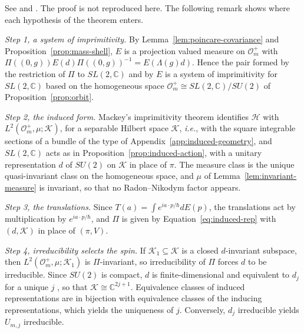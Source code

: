 	\noindent See \cite[TODO-location]{TODO-Wigner1939} and \cite[TODO-location]{TODO-Mackey1958}. The proof is not reproduced here. The following remark shows where each hypothesis of the theorem enters.
	
	\begin{remark}\label{rem:mackey-steps}
		\emph{Step 1, a system of imprimitivity.} By Lemma~\ref{lem:poincare-covariance} and Proposition~\ref{prop:mass-shell}, $E$ is a projection valued measure on $\mathcal{O}_m^+$ with $\Pi((0,g))E(d)\Pi((0,g))^{-1}=E(\Lambda(g)d)$. Hence the pair formed by the restriction of $\Pi$ to $SL(2,\mathbb{C})$ and by $E$ is a system of imprimitivity for $SL(2,\mathbb{C})$ based on the homogeneous space $\mathcal{O}_m^+\cong SL(2,\mathbb{C})/SU(2)$ of Proposition~\ref{prop:orbit}.
		
		\emph{Step 2, the induced form.} Mackey's imprimitivity theorem identifies $\mathcal{H}$ with $L^2(\mathcal{O}_m^+,\mu;\mathcal{K})$, for a separable Hilbert space $\mathcal{K}$, \textit{i.e.}, with the square integrable sections of a bundle of the type of Appendix~\ref{app:induced-geometry}, and $SL(2,\mathbb{C})$ acts as in Proposition~\ref{prop:induced-action}, with a unitary representation $d$ of $SU(2)$ on $\mathcal{K}$ in place of $\pi$. The measure class is the unique quasi-invariant class on the homogeneous space, and $\mu$ of Lemma~\ref{lem:invariant-measure} is invariant, so that no Radon--Nikodym factor appears.
		
		\emph{Step 3, the translations.} Since $T(a)=\int e^{ia\cdot p/\hbar}dE(p)$, the translations act by multiplication by $e^{ia\cdot p/\hbar}$, and $\Pi$ is given by Equation~\eqref{eq:induced-rep} with $(d,\mathcal{K})$ in place of $(\pi,V)$.
		
		\emph{Step 4, irreducibility selects the spin.} If $\mathcal{K}_1\subseteq\mathcal{K}$ is a closed $d$-invariant subspace, then $L^2(\mathcal{O}_m^+,\mu;\mathcal{K}_1)$ is $\Pi$-invariant, so irreducibility of $\Pi$ forces $d$ to be irreducible. Since $SU(2)$ is compact, $d$ is finite-dimensional and equivalent to $d_j$ for a unique $j$ \cite[TODO-location]{TODO-Hal03}, so that $\mathcal{K}\cong\mathbb{C}^{2j+1}$. Equivalence classes of induced representations are in bijection with equivalence classes of the inducing representations, which yields the uniqueness of $j$. Conversely, $d_j$ irreducible yields $U_{m,j}$ irreducible.
	\end{remark}
	
